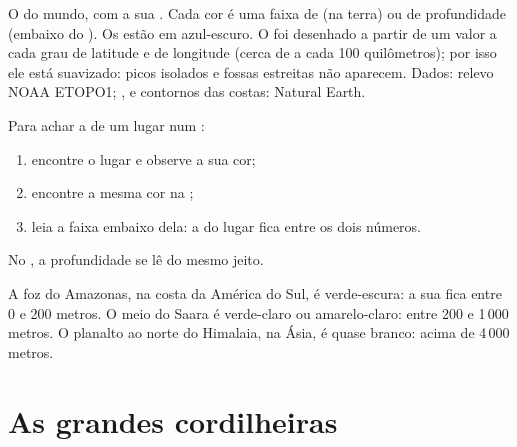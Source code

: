 \begin{omfigure}
{\small O  do mundo, com a sua . Cada cor é uma faixa de
 (na terra) ou de profundidade (embaixo do ). Os  estão em
azul-escuro. O  foi desenhado a partir de um valor a cada grau de
latitude e de longitude (cerca de a cada 100 quilômetros); por isso ele
está suavizado: picos isolados e fossas estreitas não aparecem. Dados:
relevo NOAA ETOPO1; ,  e contornos das costas: Natural Earth.}
\label{fig:g4:world-physical-map:map}
\end{omfigure}

\begin{method}\label{met:g4:world-physical-map:reading}
Para achar a  de um lugar num :
\begin{enumerate}
  \item encontre o lugar e observe a sua cor;
  \item encontre a mesma cor na ;
  \item leia a faixa embaixo dela: a  do lugar fica entre os dois
        números.
\end{enumerate}
No , a profundidade se lê do mesmo jeito.
\end{method}

\begin{example}\label{ex:g4:world-physical-map:three}
A foz do Amazonas, na costa da América do Sul, é verde-escura: a sua
 fica entre 0 e 200 metros. O meio do Saara é verde-claro ou
amarelo-claro: entre 200 e 1\,000 metros. O planalto ao norte do Himalaia,
na Ásia, é quase branco: acima de 4\,000 metros.
\end{example}

\section{As grandes cordilheiras}

